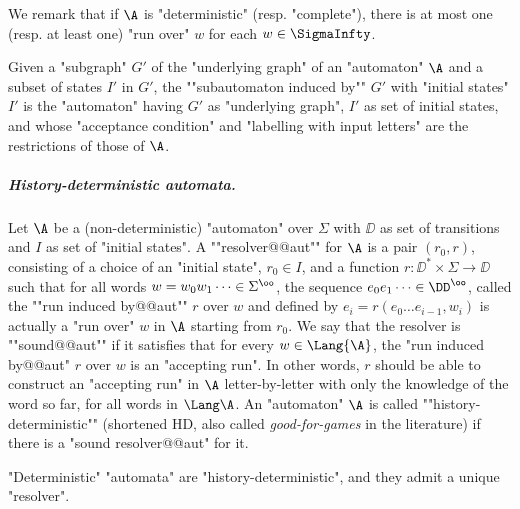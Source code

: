 \documentclass[10pt,a4paper]{amsart}
\renewcommand{\SS}{\Sigma}
\begin{document}
We remark that if $\A$ is "deterministic" (resp. "complete"), there is at most one (resp. at least one) "run over" $w$ for each $w\in \SigmaInfty$. 

\AP Given a "subgraph" $G'$ of the "underlying graph" of an "automaton" $\A$ and a subset of states $I'$ in $G'$, the ""subautomaton induced by"" $G'$ with "initial states" $I'$ is the "automaton" having $G'$ as "underlying graph", $I'$ as set of initial states, and whose "acceptance condition" and "labelling with input letters" are the restrictions of those of $\A$.


\subparagraph*{History-deterministic automata.} 
Let $\A$ be a (non-deterministic) "automaton" over $\SS$ with $\DD$ as set of transitions and $I$ as set of "initial states".
\AP A ""resolver@@aut"" for $\A$ is a pair $(r_0,r)$, consisting of a choice of an "initial state",\footnotemark{} $r_0\in I$, and a function $r\colon \DD^* \times \SS \to \DD$ such that for all words $w = w_0w_1\dots \in \SS^\oo$, the sequence $e_0e_1\dots \in \DD^\oo$, called the ""run induced by@@aut"" $r$ over $w$ and defined by $e_i = r(e_0\dots e_{i-1}, w_i)$ is actually a "run over" $w$ in $\A$ starting from $r_0$.
We say that the resolver is ""sound@@aut"" if it satisfies that for every $w\in \Lang{\A}$, the "run induced by@@aut" $r$ over $w$ is an "accepting run". 
In other words, $r$ should be able to construct an "accepting run" in $\A$ letter-by-letter with only the knowledge of the word so far, for all words in $\Lang \A$.
\AP An "automaton" $\A$ is called ""history-deterministic"" (shortened HD, also called \emph{good-for-games} in the literature) if there is a "sound resolver@@aut" for it.



\begin{remark}\label{rmk-prel:deterministic-implies-HD}
	"Deterministic" "automata" are "history-deterministic", and they admit a unique "resolver".
\end{remark}
\end{document}
